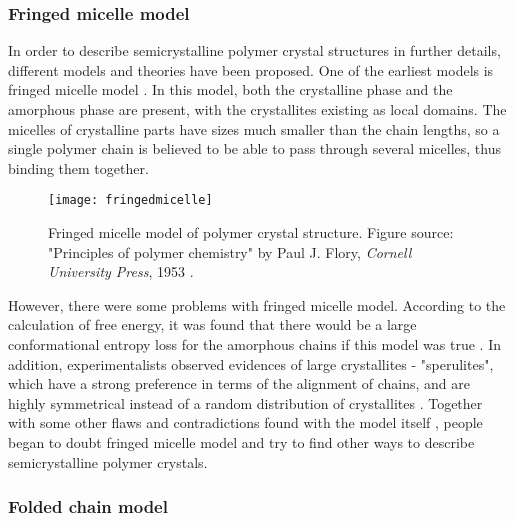 \subsubsection{Fringed micelle model}

In order to describe semicrystalline polymer crystal structures in further details, different models and theories have been proposed. One of the earliest models is fringed micelle model \cite{HerrmannKGerngrossO1930}. In this model, both the crystalline phase and the amorphous phase are present, with the crystallites existing as local domains. The micelles of crystalline parts have sizes much smaller than the chain lengths, so a single polymer chain is believed to be able to pass through several micelles, thus binding them together.


\begin{figure}[H]
\center
\vspace{1 cm}
\texttt{[image: fringedmicelle]}
\caption[Fringed micelle model of polymer crystal structure.]{Fringed micelle model of polymer crystal structure. Figure source: "Principles of polymer chemistry" by Paul J. Flory, \textit{Cornell University Press}, 1953 \cite{Flory1953}.}
\label{fig:fringedmicelle}
\end{figure}

However, there were some problems with fringed micelle model. According to the calculation of free energy, it was found that there would be a large conformational entropy loss for the amorphous chains if this model was true \cite{Flory1962}. In addition, experimentalists observed evidences of large crystallites - "sperulites", which have a strong preference in terms of the alignment of chains, and are highly symmetrical instead of a random distribution of crystallites \cite{Geil1964}. Together with some other flaws and contradictions found with the model itself \cite{Zachmann1967,Zachmann1969}, people began to doubt fringed micelle model and try to find other ways to describe semicrystalline polymer crystals.

\subsubsection{Folded chain model} \label{sec: folded chain model}

